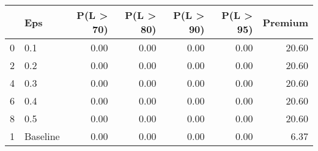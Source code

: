 \begin{tabular}{llrrrrr}
\toprule
{} &       Eps &  P(L > 70) &  P(L > 80) &  P(L > 90) &  P(L > 95) &  Premium \\
\midrule
0 &       0.1 &       0.00 &       0.00 &       0.00 &       0.00 &    20.60 \\
2 &       0.2 &       0.00 &       0.00 &       0.00 &       0.00 &    20.60 \\
4 &       0.3 &       0.00 &       0.00 &       0.00 &       0.00 &    20.60 \\
6 &       0.4 &       0.00 &       0.00 &       0.00 &       0.00 &    20.60 \\
8 &       0.5 &       0.00 &       0.00 &       0.00 &       0.00 &    20.60 \\
1 &  Baseline &       0.00 &       0.00 &       0.00 &       0.00 &     6.37 \\
\bottomrule
\end{tabular}
